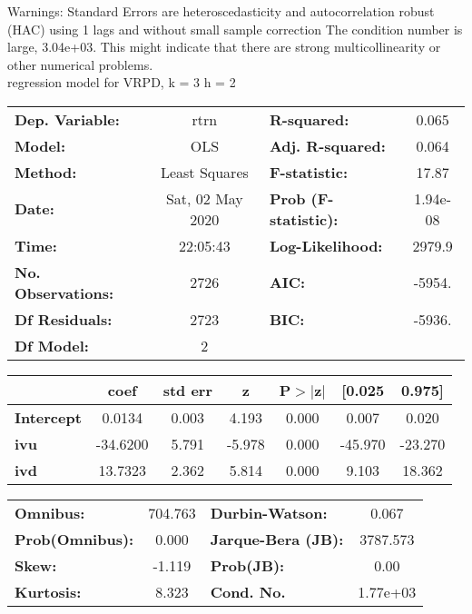 Warnings: \newline
 [1] Standard Errors are heteroscedasticity and autocorrelation robust (HAC) using 1 lags and without small sample correction \newline
 [2] The condition number is large, 3.04e+03. This might indicate that there are \newline
 strong multicollinearity or other numerical problems.\\ 

regression model for VRPD, k = 3 h = 2\begin{center}
\begin{tabular}{lclc}
\toprule
\textbf{Dep. Variable:}    &       rtrn       & \textbf{  R-squared:         } &     0.065   \\
\textbf{Model:}            &       OLS        & \textbf{  Adj. R-squared:    } &     0.064   \\
\textbf{Method:}           &  Least Squares   & \textbf{  F-statistic:       } &     17.87   \\
\textbf{Date:}             & Sat, 02 May 2020 & \textbf{  Prob (F-statistic):} &  1.94e-08   \\
\textbf{Time:}             &     22:05:43     & \textbf{  Log-Likelihood:    } &    2979.9   \\
\textbf{No. Observations:} &        2726      & \textbf{  AIC:               } &    -5954.   \\
\textbf{Df Residuals:}     &        2723      & \textbf{  BIC:               } &    -5936.   \\
\textbf{Df Model:}         &           2      & \textbf{                     } &             \\
\bottomrule
\end{tabular}
\begin{tabular}{lcccccc}
                   & \textbf{coef} & \textbf{std err} & \textbf{z} & \textbf{P$> |$z$|$} & \textbf{[0.025} & \textbf{0.975]}  \\
\midrule
\textbf{Intercept} &       0.0134  &        0.003     &     4.193  &         0.000        &        0.007    &        0.020     \\
\textbf{ivu}       &     -34.6200  &        5.791     &    -5.978  &         0.000        &      -45.970    &      -23.270     \\
\textbf{ivd}       &      13.7323  &        2.362     &     5.814  &         0.000        &        9.103    &       18.362     \\
\bottomrule
\end{tabular}
\begin{tabular}{lclc}
\textbf{Omnibus:}       & 704.763 & \textbf{  Durbin-Watson:     } &    0.067  \\
\textbf{Prob(Omnibus):} &   0.000 & \textbf{  Jarque-Bera (JB):  } & 3787.573  \\
\textbf{Skew:}          &  -1.119 & \textbf{  Prob(JB):          } &     0.00  \\
\textbf{Kurtosis:}      &   8.323 & \textbf{  Cond. No.          } & 1.77e+03  \\
\bottomrule
\end{tabular}
\end{center}

